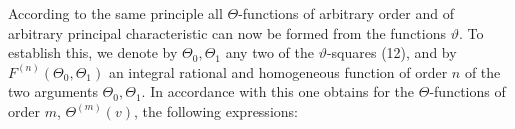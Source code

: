 According to the same principle all $\Theta$-functions of arbitrary
order and of arbitrary principal characteristic can now be formed from
the functions $\vartheta$. To establish this, we denote by
$\Theta_0, \Theta_1$ any two of the $\vartheta$-squares (12), and by $F^{(n)}(\Theta_0,\Theta_1)$ an
integral rational and homogeneous function of order $n$ of the two
arguments $\Theta_0, \Theta_1$. In accordance with this one obtains for the $\Theta$-functions
of order $m$, $\Theta^{(m)}(v)$, the following expressions:

